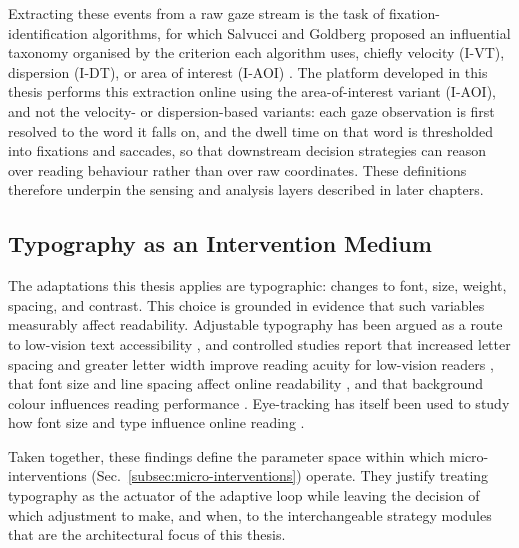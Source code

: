 Extracting these events from a raw gaze stream is the task of fixation-identification algorithms, for which Salvucci and Goldberg proposed an influential taxonomy organised by the criterion each algorithm uses, chiefly velocity (I-VT), dispersion (I-DT), or area of interest (I-AOI) \cite{salvucci2000identifying}.
The platform developed in this thesis performs this extraction online using the area-of-interest variant (I-AOI), and not the velocity- or dispersion-based variants: each gaze observation is first resolved to the word it falls on, and the dwell time on that word is thresholded into fixations and saccades, so that downstream decision strategies can reason over reading behaviour rather than over raw coordinates.
These definitions therefore underpin the sensing and analysis layers described in later chapters.

\subsection{Typography as an Intervention Medium}
\label{subsec:typography-medium}
The adaptations this thesis applies are typographic: changes to font, size, weight, spacing, and contrast.
This choice is grounded in evidence that such variables measurably affect readability.
Adjustable typography has been argued as a route to low-vision text accessibility \cite{arditi2004adjustable}, and controlled studies report that increased letter spacing and greater letter width improve reading acuity for low-vision readers \cite{beier2021letterspacing}, that font size and line spacing affect online readability \cite{rello2016makeitbig}, and that background colour influences reading performance \cite{rello2017backgroundcolors}.
Eye-tracking has itself been used to study how font size and type influence online reading \cite{beymer2008eyetracking}.

Taken together, these findings define the parameter space within which micro-interventions (Sec.~\ref{subsec:micro-interventions}) operate.
They justify treating typography as the actuator of the adaptive loop while leaving the decision of which adjustment to make, and when, to the interchangeable strategy modules that are the architectural focus of this thesis.
